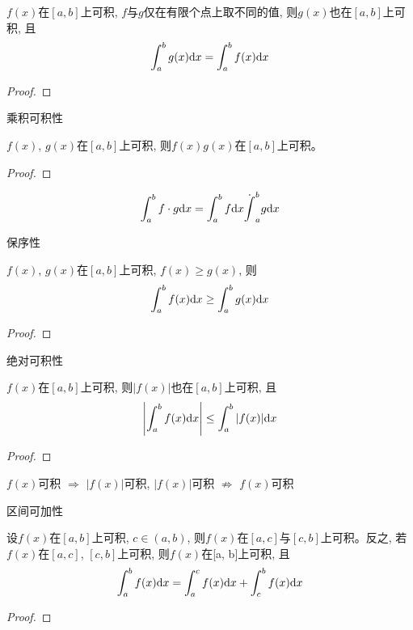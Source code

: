 \begin{lemma}
    $f(x)$在$[a, b]$上可积, $f$与$g$仅在有限个点上取不同的值, 则$g(x)$也在$[a, b]$上可积, 且
    \begin{equation*}
        \int_{a}^{b}g(x)\mathrm{d} x = \int_{a}^{b}f(x)\mathrm{d} x
    \end{equation*} 
\end{lemma}
\begin{proof}
    
\end{proof}

乘积可积性
\begin{theorem}[乘积可积性]
    $f(x)$, $g(x)$在$[a, b]$上可积, 则$f(x)g(x)$在$[a, b]$上可积。
\end{theorem}
\begin{proof}
    
\end{proof}
\begin{remark}
    \begin{equation*}
        \int_{a}^{b}f \cdot g \mathrm{d} x = \int_{a}^{b}f \mathrm{d} x \dot \int_{a}^{b}g \mathrm{d} x
    \end{equation*}
\end{remark}

保序性
\begin{theorem}[保序性]
    $f(x)$, $g(x)$在$[a, b]$上可积, $f(x) \ge g(x)$, 则
    \begin{equation*}
        \int_{a}^{b} f(x) \mathrm{d} x \ge \int_{a}^{b} g(x) \mathrm{d} x
    \end{equation*}
\end{theorem}
\begin{proof}
    
\end{proof}

绝对可积性
\begin{theorem}[绝对可积性]
    $f(x)$在$[a, b]$上可积, 则$|f(x)|$也在$[a, b]$上可积, 且
    \begin{equation*}
        \left|\int_{a}^{b}f(x) \mathrm{d} x \right| \le \int_{a}^{b}|f(x)| \mathrm{d} x
    \end{equation*}
\end{theorem}
\begin{proof}
    
\end{proof}
\begin{remark}
    $f(x)$可积 $\Rightarrow$ $|f(x)|$可积, $|f(x)|$可积 $\nRightarrow$ $f(x)$可积
\end{remark}

区间可加性
\begin{theorem}[区间可加性]
    设$f(x)$在$[a, b]$上可积, $c \in (a, b)$, 则$f(x)$在$[a, c]$与$[c, b]$上可积。反之, 若$f(x)$在$[a, c]$, $[c, b]$上可积, 则$f(x)$在[a, b]上可积, 且
    \begin{equation*}
        \int_{a}^{b}f(x) \mathrm{d} x = \int_{a}^{c}f(x) \mathrm{d} x + \int_{c}^{b}f(x) \mathrm{d} x
    \end{equation*}
\end{theorem}
\begin{proof}
    
\end{proof}

